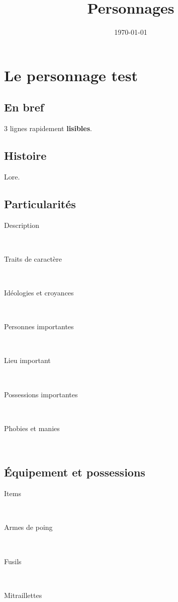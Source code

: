 \documentclass[11pt]{article}
\date{\today}
\title{Personnages}
\begin{document}
\section{Le personnage test}
\label{sec:orgbe9658a}
\begin{twocols}
\subsection{En bref}
\label{sec:orgfdb94db}

3 lignes rapidement \textbf{lisibles}.

\subsection{Histoire}
\label{sec:org7ebfb2f}

Lore. 

\subsection{Particularités}
\label{sec:orgf27f2de}

\begin{description}
\item[{Description}] ~\\[2em]
\item[{Traits de caractère}] ~\\[2em]
\item[{Idéologies et croyances}] ~\\[2em]
\item[{Personnes importantes}] ~\\[2em]
\item[{Lieu important}] ~\\[2em]
\item[{Possessions importantes}] ~\\[2em]
\item[{Phobies et manies}] ~\\[2em]
\end{description}

\subsection{Équipement et possessions}
\label{sec:orga4965ce}


\begin{description}
\item[{Items}] ~\\[2em]
\item[{Armes de poing}] ~\\[2em]
\item[{Fusils}] ~\\[2em]
\item[{Mitraillettes}] ~\\[2em]
\end{description}

\end{twocols}
\end{document}
